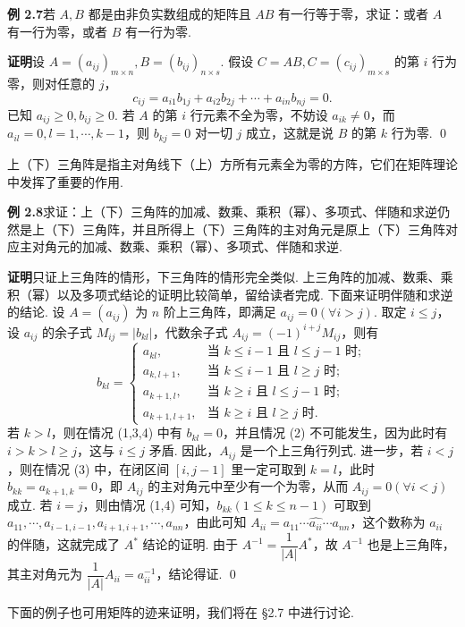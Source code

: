 \documentclass[UTF8, 12pt, fontset=fandol, oneside]{ctexart}
\begin{document}
\noindent\textbf{例 2.7}\quad 若 $A,B$ 都是由非负实数组成的矩阵且 $AB$ 有一行等于零，求证：或者 $A$ 有一行为零，或者 $B$ 有一行为零.

\noindent\textbf{证明}\quad 设 $A=(a_{ij})_{m\times n},B=(b_{ij})_{n\times s}$. 假设 $C=AB,C=(c_{ij})_{m\times s}$ 的第 $i$ 行为零，则对任意的 $j$，
\[
c_{ij}=a_{i1}b_{1j}+a_{i2}b_{2j}+\cdots+a_{in}b_{nj}=0.
\]
已知 $a_{ij}\ge0,b_{ij}\ge0$. 若 $A$ 的第 $i$ 行元素不全为零，不妨设 $a_{ik}\ne0$，而 $a_{il}=0,l=1,\cdots,k-1$，则 $b_{kj}=0$ 对一切 $j$ 成立，这就是说 $B$ 的第 $k$ 行为零. \qed

上（下）三角阵是指主对角线下（上）方所有元素全为零的方阵，它们在矩阵理论中发挥了重要的作用.

\noindent\textbf{例 2.8}\quad 求证：上（下）三角阵的加减、数乘、乘积（幂）、多项式、伴随和求逆仍然是上（下）三角阵，并且所得上（下）三角阵的主对角元是原上（下）三角阵对应主对角元的加减、数乘、乘积（幂）、多项式、伴随和求逆.

\noindent\textbf{证明}\quad 只证上三角阵的情形，下三角阵的情形完全类似. 上三角阵的加减、数乘、乘积（幂）以及多项式结论的证明比较简单，留给读者完成. 下面来证明伴随和求逆的结论. 设 $A=(a_{ij})$ 为 $n$ 阶上三角阵，即满足 $a_{ij}=0(\forall i>j)$. 取定 $i\le j$，设 $a_{ij}$ 的余子式 $M_{ij}=|b_{kl}|$，代数余子式 $A_{ij}=(-1)^{i+j}M_{ij}$，则有
\[
b_{kl}=
\begin{cases}
a_{kl}, & \text{当 } k\le i-1 \text{ 且 } l\le j-1 \text{ 时};\\
a_{k,l+1}, & \text{当 } k\le i-1 \text{ 且 } l\ge j \text{ 时};\\
a_{k+1,l}, & \text{当 } k\ge i \text{ 且 } l\le j-1 \text{ 时};\\
a_{k+1,l+1}, & \text{当 } k\ge i \text{ 且 } l\ge j \text{ 时}.
\end{cases}
\]
若 $k>l$，则在情况 (1,3,4) 中有 $b_{kl}=0$，并且情况 (2) 不可能发生，因为此时有 $i>k>l\ge j$，这与 $i\le j$ 矛盾. 因此，$A_{ij}$ 是一个上三角行列式. 进一步，若 $i<j$，则在情况 (3) 中，在闭区间 $[i,j-1]$ 里一定可取到 $k=l$，此时 $b_{kk}=a_{k+1,k}=0$，即 $A_{ij}$ 的主对角元中至少有一个为零，从而 $A_{ij}=0(\forall i<j)$ 成立. 若 $i=j$，则由情况 (1,4) 可知，$b_{kk}(1\le k\le n-1)$ 可取到 $a_{11},\cdots,a_{i-1,i-1},a_{i+1,i+1},\cdots,a_{nn}$，由此可知 $A_{ii}=a_{11}\cdots\widehat{a_{ii}}\cdots a_{nn}$，这个数称为 $a_{ii}$ 的伴随，这就完成了 $A^*$ 结论的证明. 由于 $A^{-1}=\dfrac1{|A|}A^*$，故 $A^{-1}$ 也是上三角阵，其主对角元为 $\dfrac1{|A|}A_{ii}=a_{ii}^{-1}$，结论得证. \qed

下面的例子也可用矩阵的迹来证明，我们将在 §2.7 中进行讨论.
\end{document}
